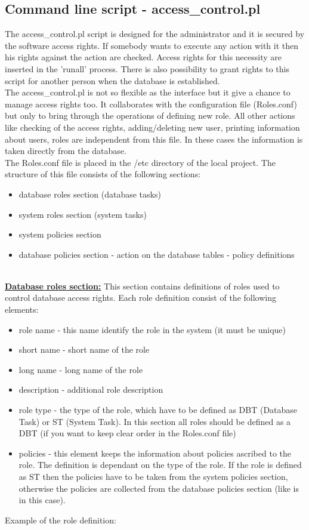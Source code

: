 \subsection{Command line script - access\_control.pl}
The access\_control.pl script is designed for the administrator and it is secured by the software access rights. If somebody wants to execute any action with it then his rights against the action are checked. Access rights for this necessity are inserted in the 'runall' process. There is also possibility to grant rights to this script for another person when the database is established.\\
The access\_control.pl is not so flexible as the interface but it give a chance to manage access rights too. It collaborates with the configuration file (Roles.conf) but only to bring through the operations of defining new role. All other actions like checking of the access rights, adding/deleting new user, printing information about users, roles are independent from this file. In these cases the information is taken directly from the database. \\
The Roles.conf file is placed in the /etc directory of the local project. The structure of this file consists of the following sections:
\begin{itemize}
\item database roles section (database tasks) 
\item system roles section (system tasks)
\item system policies section
\item database policies section
\subitem- action on the database tables
\subitem- policy definitions
\end{itemize}

\textbf{} \\
\underline{\textbf{Database roles section:}}
This section contains definitions of roles used to control database access rights. Each role definition consist of the following elements:
\begin{itemize}
\item role name - this name identify the role in the system (it must be unique)
\item short name - short name of the role
\item long name - long name of the role
\item description - additional role description
\item role type -  the type of the role, which have to be defined as DBT (Database Task) or ST (System Task). In this section all roles should be defined as a DBT (if you want to keep clear order in the Roles.conf file)
\item policies - this element keeps the information about policies ascribed to the role. The definition is dependant on the type of the role. If the role is defined as ST then the policies have to be taken from the system policies section, otherwise the policies are collected from the database policies section (like is in this case).
\end{itemize}
Example of the role definition:

